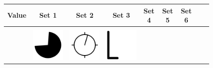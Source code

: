 \documentclass[doc]{apa6}
\newcommand{\stimulusscale}{.1}
\begin{document}
\begin{figure}[p]
\begin{center}
\footnotesize
\begin{tabular}{c|cccccccc}
Value & Set 1 & Set 2 & Set 3 & Set 4 & Set 5 & Set 6 \\ \hline
 \\
 \raisebox{.75cm}{55} &
\includegraphics[scale=\stimulusscale]{./set1stim55.png} &
\includegraphics[scale=\stimulusscale]{./set2stim55.png} &
\includegraphics[scale=\stimulusscale]{./set3stim55.png} &

\end{tabular}
\end{center}
\end{figure}
\end{document}
